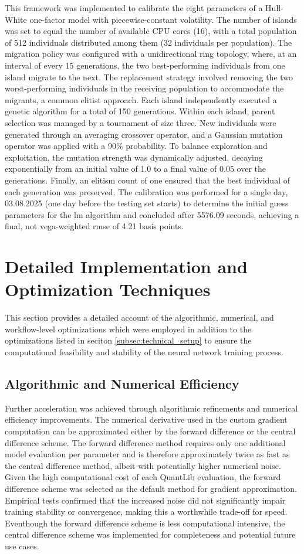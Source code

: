 This framework was implemented to calibrate the eight parameters of a Hull-White one-factor model with piecewise-constant volatility. The number of islands was set to equal the number of available CPU cores (16), with a total population of 512 individuals distributed among them (32 individuals per population). The migration policy was configured with a unidirectional ring topology, where, at an interval of every 15 generations, the two best-performing individuals from one island migrate to the next. The replacement strategy involved removing the two worst-performing individuals in the receiving population to accommodate the migrants, a common elitist approach. Each island independently executed a genetic algorithm for a total of 150 generations. Within each island, parent selection was managed by a tournament of size three. New individuals were generated through an averaging crossover operator, and a Gaussian mutation operator was applied with a 90\% probability. To balance exploration and exploitation, the mutation strength was dynamically adjusted, decaying exponentially from an initial value of 1.0 to a final value of 0.05 over the generations. Finally, an elitism count of one ensured that the best individual of each generation was preserved. The calibration was performed for a single day, 03.08.2025 (one day before the testing set starts) to determine the initial guess parameters for the \ac{lm} algorithm and concluded after 5576.09 seconds, achieving a final, not vega-weighted \ac{rmse} of 4.21 basis points.

\section{Detailed Implementation and Optimization Techniques}
\label{sec:appendix_implementation_details}
This section provides a detailed account of the algorithmic, numerical, and workflow-level optimizations which were employed in addition to the optimizations listed in seciton \ref{subsec:technical_setup} to ensure the computational feasibility and stability of the neural network training process.

\subsection{Algorithmic and Numerical Efficiency}
Further acceleration was achieved through algorithmic refinements and numerical efficiency improvements. The numerical derivative used in the custom gradient computation can be approximated either by the forward difference or the central difference scheme. The forward difference method requires only one additional model evaluation per parameter and is therefore approximately twice as fast as the central difference method, albeit with potentially higher numerical noise. Given the high computational cost of each QuantLib evaluation, the forward difference scheme was selected as the default method for gradient approximation. Empirical tests confirmed that the increased noise did not significantly impair training stability or convergence, making this a worthwhile trade-off for speed. Eventhough the forward difference scheme is less computational intensive, the central difference scheme was implemented for completeness and potential future use cases.

